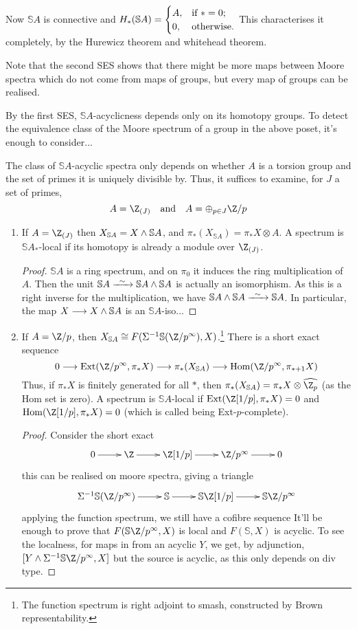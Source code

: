\documentclass[11pt]{article}
\begin{document}
\begin{MarkusLocalisation}
\begin{exmp*}
Now $\mathbb{S}A$ is connective and $H_*(\mathbb{S}A)=\begin{cases}
A,&\textup{if }*=0;\\
0,&\textup{otherwise}.
\end{cases}$ This characterises it completely, by the Hurewicz theorem and whitehead theorem.

Note that the second SES shows that there might be more maps between Moore spectra which do not come from maps of groups, but every map of groups can be realised.
\end{exmp*}
By the first SES, $\mathbb{S}A$-acyclicness depends only on its homotopy groups. To detect the equivalence class of the Moore spectrum of a group in the above poset, it's enough to consider...

The class of $\mathbb{S}A$-acyclic spectra only depends on whether $A$ is a torsion group and the set of primes it is uniquely divisible by. Thus, it suffices to examine, for $J$ a set of primes,
\[A=\Z_{(J)}\textup{\quad and\quad }A=\oplus_{p\in J}\Z/p\]
\begin{enumerate}\squishlist
\item If $A=\Z_{(J)}$ then $X_{\mathbb{S}A}=X\wedge \mathbb{S}A$, and $\pi_*(X_{\mathbb{S}A})=\pi_*X\otimes A$. A spectrum is $\mathbb{S}A_*$-local if its homotopy is already a module over $\Z_{(J)}$.
\begin{proof}
$\mathbb{S}A$ is a ring spectrum, and on $\pi_0$ it induces the ring multiplication of $A$. Then the unit $\mathbb{S}A\weakequiv\mathbb{S}A\sprod\mathbb{S}A$ is actually an isomorphism. As this is a right inverse for the multiplication, we have $\mathbb{S}A\sprod\mathbb{S}A\weakequiv\mathbb{S}A$. In particular, the map $X\longrightarrow X\wedge \mathbb{S}A$ is an $\mathbb{S}A$-iso...
\end{proof}
\item If $A=\Z/p$, then $X_{\mathbb{S}A}\cong F(\Sigma^{-1}\mathbb{S}(\Z/p^\infty),X)$.\footnote{The function spectrum is right adjoint to smash, constructed by Brown representability.} There is a short exact sequence
\[0\to\Ext(\Z/p^\infty,\pi_{*}X)\to\pi_*(X_{\mathbb{S}A})\to\Hom(\Z/p^\infty,\pi_{*+1}X)\]
Thus, if $\pi_*X$ is finitely generated for all $*$, then $\pi_*(X_{\mathbb{S}A})=\pi_{*}X\otimes\widehat{\Z_p}$ (as the Hom set is zero).
A spectrum is $\mathbb{S}A$-local if $\Ext(\Z[1/p],\pi_*X)=0$ and $\Hom(\Z[1/p],\pi_*X)=0$ (which is called being Ext-$p$-complete).
\begin{proof}
Consider the short exact
\[\xymatrix{
0\ar[r]&
\Z\ar[r]&
\Z[1/p]\ar[r]&
\Z/p^\infty\ar[r]&
0
}\]
this can be realised on moore spectra, giving a triangle
\[\xymatrix{
\Sigma^{-1}\mathbb{S}(\Z/p^\infty)\ar[r]&
\mathbb{S}\ar[r]&
\mathbb{S}\Z[1/p]\ar[r]&
\mathbb{S}\Z/p^\infty
}\]
applying the function spectrum, we still have a cofibre sequence
It'll be enough to prove that $F(\mathbb{S}\Z/p^\infty,X)$ is local and $F(\mathbb{S},X)$ is acyclic. To see the localness, for maps in from an acyclic $Y$, we get, by adjunction, $[Y\sprod \Sigma^{-1}\mathbb{S}\Z/p^\infty,X]$ but the source is acyclic, as this only depends on div type.


\end{proof}
\end{enumerate}
\end{MarkusLocalisation}
\end{document}
